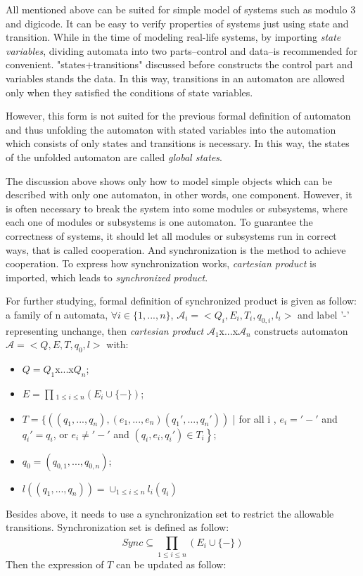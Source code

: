 \documentclass[11pt, conference]{IEEEtran}
\begin{document}
    All mentioned above can be suited for simple model of systems such as modulo 3 and digicode. It can be easy to verify properties of systems just using state and transition. While in the time of modeling real-life systems, by importing {\itshape state variables}, dividing automata into two parts--control and data--is recommended for convenient. "states+transitions" discussed before constructs the control part and variables stands the data. In this way, transitions in an automaton are allowed only when they satisfied the conditions of state variables.

    However, this form is not suited for the previous formal definition of automaton and thus unfolding the automaton with stated variables into the automation which consists of only states and transitions is necessary. In this way, the states of the unfolded automaton  are called {\itshape global states}.

    The discussion above shows only how to model simple objects which can be described with only one automaton, in other words, one component. However, it is often necessary to break the system into some modules or subsystems, where each one of  modules or subsystems is one automaton. To guarantee the correctness of systems, it should let all modules or subsystems run in correct ways, that is called cooperation. And synchronization is the method to achieve cooperation. To express how synchronization works, {\itshape cartesian product} is imported, which leads to {\itshape synchronized product}.

    For further studying, formal definition of synchronized product is given as follow: a family of n automata, $\forall{i} \in \{1,...,n\}$, $\mathcal{A}_i=<Q_i, E_i,T_i,q_{0,i},l_i>$ and label '-' representing unchange, then {\itshape cartesian product} $\mathcal{A}_1$x...x$\mathcal{A}_n$ constructs automaton $\mathcal{A} =<Q,E,T,q_0,l>$ with:
     \begin{itemize}
      \item $Q=Q_1$x...x$Q_n$;
      \item $E=\prod_{}{}_{1\leq i \leq n}(E_i\cup\{-\})$;
      \item $T=\left.\{ ((q_1,...,q_n),(e_1,...,e_n)(q_1',...,q_n'))  \right.$  | for all i , $e_i='-'$ and $q_i'=q_i$, or $e_i\neq '-'$ and $(q_i,e_i,q_i')\in T_i \left.\right\} $;
      \item $q_0=(q_{0,1},...,q_{0,n})$;
      \item $l((q_1,...,q_n))=\cup _{1\leq i \leq n}l_i(q_i)$
    \end{itemize}
    Besides above, it needs to use a synchronization set to restrict the allowable transitions. Synchronization set is defined as follow:
    \begin{equation*}
      Sync \subseteq \prod_{1\leq i \leq n}^{}(E_i\cup\{-\})
    \end{equation*}
    Then the expression of $T$ can be updated as follow:
    
\end{document}
